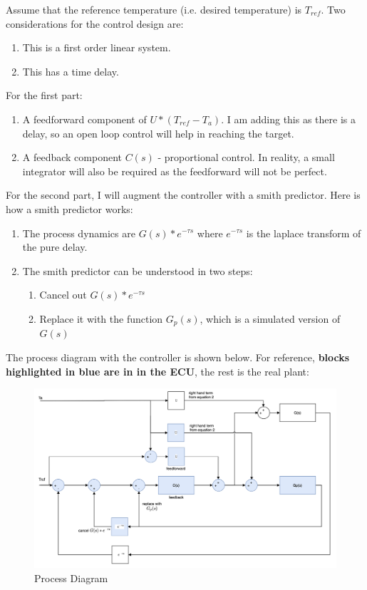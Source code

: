 Assume that the reference temperature (i.e. desired temperature) is \(T_{ref}\).
\noindent
\newline
\newline
Two considerations for the control design are:
\begin{enumerate}
  \item This is a first order linear system.
  \item This has a time delay.
\end{enumerate}
\noindent
For the first part:
\begin{enumerate}
  \item A feedforward component of \(U*(T_{ref} - T_a)\). I am adding this as there is a delay, so an open loop control will help in reaching the target.
  \item A feedback component \(C(s)\) - proportional control. In reality, a small integrator will also be required as the feedforward will not be perfect.
\end{enumerate}
For the second part, I will augment the controller with a smith predictor. Here is how a smith predictor works:
\begin{enumerate}
  \item The process dynamics are \(G(s)*e^{-\tau s}\) where \(e^{-\tau s}\) is the laplace transform of the pure delay.
  \item The smith predictor can be understood in two steps:
  \begin{enumerate}
  \item Cancel out \(G(s)*e^{-\tau s}\)
  \item Replace it with the function \(G_p(s)\), which is a simulated version of \(G(s)\)
  \end{enumerate}
\end{enumerate}

\noindent
\newline
\newline
The process diagram with the controller is shown below. For reference, \textbf{blocks highlighted in \textcolor{TealBlue}{blue} are in in the ECU}, the rest is the real plant: \\

\begin{figure}[h!]
  \includegraphics[width=\textwidth]{control_diagram}
  \caption{Process Diagram}
\end{figure}